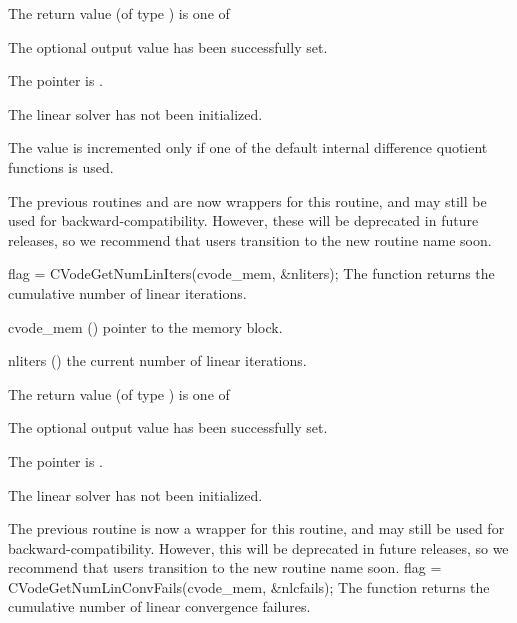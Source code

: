 {
  The return value  (of type ) is one of
  \begin{args}
  \item[\Id{CVLS\_SUCCESS}]
    The optional output value has been successfully set.
  \item[\Id{CVLS\_MEM\_NULL}]
    The  pointer is .
  \item[\Id{CVLS\_LMEM\_NULL}]
    The {\cvls} linear solver has not been initialized.
  \end{args}
}
{
  The value  is incremented only if one of the default
  internal difference quotient functions is used.

  The previous routines  and
   are now wrappers for this routine, and may
  still be used for backward-compatibility.  However, these will be
  deprecated in future releases, so we recommend that users transition
  to the new routine name soon.
}
{
  flag = CVodeGetNumLinIters(cvode\_mem, \&nliters);
}
{
  The function  returns the
  cumulative number of linear iterations.
}
{
  \begin{args}
  \item[cvode\_mem] ()
    pointer to the {\cvodes} memory block.
  \item[nliters] ()
    the current number of linear iterations.
  \end{args}
}
{
  The return value  (of type ) is one of
  \begin{args}
  \item[\Id{CVLS\_SUCCESS}]
    The optional output value has been successfully set.
  \item[\Id{CVLS\_MEM\_NULL}]
    The  pointer is .
  \item[\Id{CVLS\_LMEM\_NULL}]
    The {\cvls} linear solver has not been initialized.
  \end{args}
}
{
  The previous routine  is now a wrapper for
  this routine, and may still be used for backward-compatibility.
  However, this will be deprecated in future releases, so we recommend
  that users transition to the new routine name soon.
}
{
  flag = CVodeGetNumLinConvFails(cvode\_mem, \&nlcfails);
}
{
  The function  returns the
  cumulative number of linear convergence failures.
}
